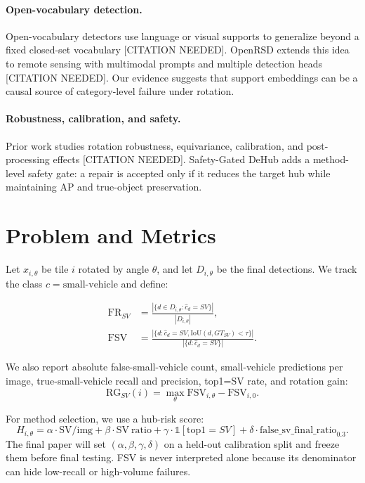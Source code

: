 \documentclass[letterpaper]{article}
\newcommand{\ours}{Safety-Gated DeHub}
\newcommand{\sv}{small-vehicle}
\begin{document}
\paragraph{Open-vocabulary detection.}
Open-vocabulary detectors use language or visual supports to generalize beyond a fixed closed-set vocabulary [CITATION NEEDED]. OpenRSD extends this idea to remote sensing with multimodal prompts and multiple detection heads [CITATION NEEDED]. Our evidence suggests that support embeddings can be a causal source of category-level failure under rotation.

\paragraph{Robustness, calibration, and safety.}
Prior work studies rotation robustness, equivariance, calibration, and post-processing effects [CITATION NEEDED]. \ours{} adds a method-level safety gate: a repair is accepted only if it reduces the target hub while maintaining AP and true-object preservation.

\section{Problem and Metrics}

Let $x_{i,\theta}$ be tile $i$ rotated by angle $\theta$, and let $D_{i,\theta}$ be the final detections. We track the class $c=\text{\sv{}}$ and define:

\begin{align}
\mathrm{FR}_{SV} &= \frac{| \{d \in D_{i,\theta}: \hat{c}_d = SV \} |}{|D_{i,\theta}|},\\
\mathrm{FSV} &= \frac{| \{d: \hat{c}_d = SV, \mathrm{IoU}(d, GT_{SV}) < \tau \} |}{| \{d: \hat{c}_d = SV \} |}.
\end{align}

We also report absolute false-\sv{} count, \sv{} predictions per image, true-\sv{} recall and precision, top1=SV rate, and rotation gain:
\begin{equation}
\mathrm{RG}_{SV}(i) = \max_{\theta} \mathrm{FSV}_{i,\theta} - \mathrm{FSV}_{i,0}.
\end{equation}

For method selection, we use a hub-risk score:
\begin{equation}
H_{i,\theta} =
\alpha \cdot \mathrm{SV/img}
+ \beta \cdot \mathrm{SV\ ratio}
+ \gamma \cdot \mathbb{1}[\mathrm{top1}=SV]
+ \delta \cdot \mathrm{false\_sv\_final\_ratio}_{0.3}.
\end{equation}
The final paper will set $(\alpha,\beta,\gamma,\delta)$ on a held-out calibration split and freeze them before final testing. FSV is never interpreted alone because its denominator can hide low-recall or high-volume failures.
\end{document}
